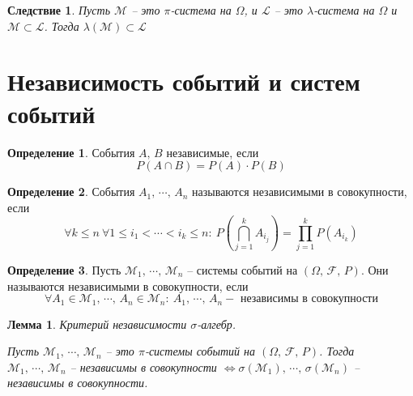 \documentclass[a4paper,12pt]{article}
\renewcommand{\leq}{\ensuremath{\leqslant}}
\theoremstyle{plain}
\newtheorem{lemma}{Лемма}[section]
\newtheorem*{corollary}{Следствие}
\theoremstyle{definition}
\newtheorem{definition}{Определение}[section]
\theoremstyle{remark}
\begin{document}
\begin{corollary}
	Пусть $\mathcal{M}$ -- это $\pi$-система на $\Omega$, и $\mathcal{L}$ -- это $\lambda$-система на $\Omega$ и $\mathcal{M} \subset \mathcal{L}$. Тогда $\lambda(\mathcal{M}) \subset \mathcal{L}$
\end{corollary}

\section{Независимость событий и систем событий}
\begin{definition}
	События $A,\, B$ независимые, если
	\[P(A \cap B) = P(A) \cdot P(B)\]
\end{definition}

\begin{definition}
	События $A_1,\,\cdots,\,A_n$ называются независимыми в совокупности, если \[\forall k \leq n \: \forall 1 \leq i_1 < \cdots < i_k \leq n :\: P\left(\bigcap_{j = 1}^k A_{i_j}\right) = \prod_{j = 1}^k P(A_{i_k}) \]
\end{definition}

\begin{definition}
	Пусть $\mathcal{M}_1,\,\cdots,\,\mathcal{M}_n$ -- системы событий на $(\Omega,\, \mathcal{F},\, P)$. Они называются независимыми в совокупности, если
	\[\forall A_1 \in \mathcal{M}_1,\, \cdots,\, A_n \in \mathcal{M}_n:\: A_1,\,\cdots,\,A_n - \text{ независимы в совокупности}\]
\end{definition}

\begin{lemma}
	Критерий независимости $\sigma$-алгебр.

	Пусть $\mathcal{M}_1,\,\cdots,\,\mathcal{M}_n$ -- это $\pi$-системы событий на $(\Omega,\, \mathcal{F},\,P)$. Тогда $\mathcal{M}_1,\,\cdots,\,\mathcal{M}_n$ -- независимы в совокупности $\Leftrightarrow \sigma(\mathcal{M}_1),\,\cdots,\,\sigma(\mathcal{M}_n)$ -- независимы в совокупности.
\end{lemma}
\end{document}
